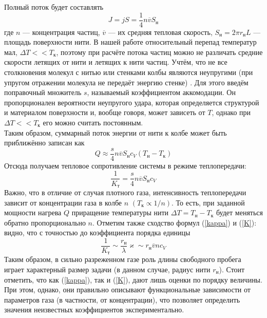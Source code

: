 \documentclass[12pt]{article}
\begin{document}
        Полный поток будет составлять
        \[
            J = jS = \frac{1}{4}n\overline{v}S_{\text{н}}
        \]
        где $n$ — концентрация частиц, $\overline{v}$ — их средняя тепловая скорость, $S_\text{н} = 2\pi r_{\text{н}}L$ — площадь поверхности нити.
        В нашей работе относительный перепад температур мал, $\Delta T << T_{\text{к}}$, поэтому при расчёте потока частиц можно не
        различать средние скорости летящих от нити и летящих к нити частиц. Учтём, что не все столкновения молекул с нитью или
        стенками колбы являются неупругими (при упругом отражении молекула не передаёт энергию
        стенке) \cite{lab_description}. Для этого введём поправочный множитель $s$, называемый коэффициентом аккомодации. Он пропорционален вероятности неупругого удара,
        которая определяется структурой и материалом поверхности и, вообще говоря, может зависеть от $T$, однако при $\Delta T << T_{\text{к}}$
        его можно считать постоянным.\\
        Таким образом, суммарный поток энергии от нити к колбе может быть приближённо записан как
        \[
            Q \approx \frac{s}{4} n \overline{v} S_{\text{н}}c_V(T_\text{н}-T_{\text{к}})
        \]
        Отсюда получаем тепловое сопротивление системы в режиме теплопередачи:
        \begin{equation}\label{K}
            \frac{1}{K_{\text{т}}} = \frac{s}{4} n \overline{v} S_{\text{н}}c_V
        \end{equation}
        Важно, что в отличие от случая плотного газа, интенсивность теплопередачи зависит от концентрации газа в колбе $n$ $(T_{\text{к}} \propto 1/n)$. То есть,
        при заданной мощности нагрева $Q$ приращение температуры нити $\Delta T = T_{\text{н}}-T_{\text{к}}$ будет
        меняться обратно пропорционально $n$. Отметим также сходство формул (\ref{kappa}) и (\ref{K}): видно, что с точностью до коэффициента порядка единицы
        \[
            \frac{1}{K_{\text{т}}} \sim \frac{r_{\text{н}}}{\lambda}\varkappa \sim r_{\text{н}}\overline{v}nc_V
        \]
        Таким образом, в сильно разреженном газе роль длины свободного пробега
        играет характерный размер задачи (в данном случае, радиус нити $r_{\text{н}}$). Стоит отметить, что как (\ref{kappa}), так и (\ref{K}), дают лишь оценки по порядку
        величины. При этом, однако, они правильно описывают функциональные зависимости от параметров газа (в частности, от концентрации), что позволяет
        определить значения неизвестных коэффициентов экспериментально.\\
\end{document}
